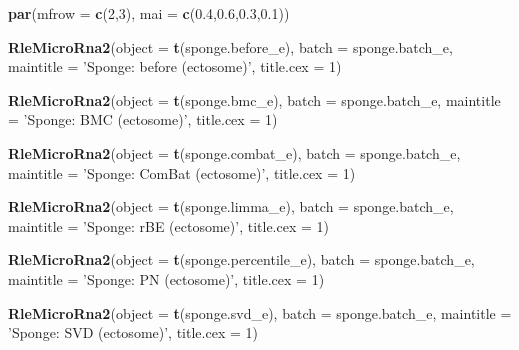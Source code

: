 \documentclass[]{book}
\newenvironment{Shaded}{\begin{snugshade}}{\end{snugshade}}
\newcommand{\KeywordTok}[1]{\textcolor[rgb]{0.13,0.29,0.53}{\textbf{#1}}}
\newcommand{\DataTypeTok}[1]{\textcolor[rgb]{0.13,0.29,0.53}{#1}}
\newcommand{\DecValTok}[1]{\textcolor[rgb]{0.00,0.00,0.81}{#1}}
\newcommand{\FloatTok}[1]{\textcolor[rgb]{0.00,0.00,0.81}{#1}}
\newcommand{\StringTok}[1]{\textcolor[rgb]{0.31,0.60,0.02}{#1}}
\newcommand{\NormalTok}[1]{#1}
\begin{document}
\begin{Shaded}
\begin{Highlighting}[]
\KeywordTok{par}\NormalTok{(}\DataTypeTok{mfrow =} \KeywordTok{c}\NormalTok{(}\DecValTok{2}\NormalTok{,}\DecValTok{3}\NormalTok{), }\DataTypeTok{mai =} \KeywordTok{c}\NormalTok{(}\FloatTok{0.4}\NormalTok{,}\FloatTok{0.6}\NormalTok{,}\FloatTok{0.3}\NormalTok{,}\FloatTok{0.1}\NormalTok{))}

\KeywordTok{RleMicroRna2}\NormalTok{(}\DataTypeTok{object =} \KeywordTok{t}\NormalTok{(sponge.before_e), }\DataTypeTok{batch =}\NormalTok{ sponge.batch_e, }
             \DataTypeTok{maintitle =} \StringTok{'Sponge: before (ectosome)'}\NormalTok{, }\DataTypeTok{title.cex =} \DecValTok{1}\NormalTok{)}

\KeywordTok{RleMicroRna2}\NormalTok{(}\DataTypeTok{object =} \KeywordTok{t}\NormalTok{(sponge.bmc_e), }\DataTypeTok{batch =}\NormalTok{ sponge.batch_e, }
             \DataTypeTok{maintitle =} \StringTok{'Sponge: BMC (ectosome)'}\NormalTok{, }\DataTypeTok{title.cex =} \DecValTok{1}\NormalTok{)}

\KeywordTok{RleMicroRna2}\NormalTok{(}\DataTypeTok{object =} \KeywordTok{t}\NormalTok{(sponge.combat_e), }\DataTypeTok{batch =}\NormalTok{ sponge.batch_e, }
             \DataTypeTok{maintitle =} \StringTok{'Sponge: ComBat (ectosome)'}\NormalTok{, }\DataTypeTok{title.cex =} \DecValTok{1}\NormalTok{)}

\KeywordTok{RleMicroRna2}\NormalTok{(}\DataTypeTok{object =} \KeywordTok{t}\NormalTok{(sponge.limma_e), }\DataTypeTok{batch =}\NormalTok{ sponge.batch_e, }
             \DataTypeTok{maintitle =} \StringTok{'Sponge: rBE (ectosome)'}\NormalTok{, }\DataTypeTok{title.cex =} \DecValTok{1}\NormalTok{)}

\KeywordTok{RleMicroRna2}\NormalTok{(}\DataTypeTok{object =} \KeywordTok{t}\NormalTok{(sponge.percentile_e), }\DataTypeTok{batch =}\NormalTok{ sponge.batch_e, }
             \DataTypeTok{maintitle =} \StringTok{'Sponge: PN (ectosome)'}\NormalTok{, }\DataTypeTok{title.cex =} \DecValTok{1}\NormalTok{)}

\KeywordTok{RleMicroRna2}\NormalTok{(}\DataTypeTok{object =} \KeywordTok{t}\NormalTok{(sponge.svd_e), }\DataTypeTok{batch =}\NormalTok{ sponge.batch_e, }
             \DataTypeTok{maintitle =} \StringTok{'Sponge: SVD (ectosome)'}\NormalTok{, }\DataTypeTok{title.cex =} \DecValTok{1}\NormalTok{)}
\end{Highlighting}
\end{Shaded}
\end{document}
